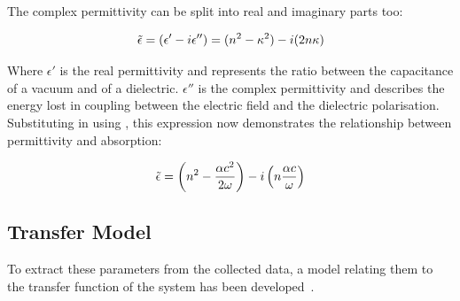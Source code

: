 The complex permittivity can be split into real and imaginary parts too:

\begin{equation}
\Tilde{\epsilon} = (\epsilon' - i\epsilon'') = (n^2 - \kappa^2) - i(2n\kappa)
\end{equation}

Where \(\epsilon'\) is the real permittivity and represents the ratio between the capacitance of a vacuum and of a dielectric. \(\epsilon''\) is the complex permittivity and describes the energy lost in coupling between the electric field and the dielectric polarisation. Substituting in using , this expression now demonstrates the relationship between permittivity and absorption:

\begin{equation}
\Tilde{\epsilon} = \left(n^2 - \frac{\alpha c^2}{2\omega}\right) - i\left(n\frac{\alpha c}{\omega}\right)
\end{equation}

\subsection{Transfer Model}
To extract these parameters from the collected data, a model relating them to the transfer function of the system has been developed~\cite{Duvillaret1996}. 

